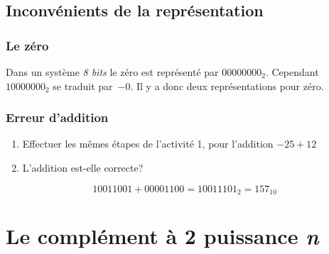 \documentclass[a4paper,11pt]{article}
\begin{document}
\begin{Form}
\subsection{Inconvénients de la représentation}
\subsubsection{Le zéro}
Dans un système \emph{8 bits} le zéro est représenté par $00000000_2$. Cependant $10000000_2$ se traduit par~$-0$. Il y a donc deux représentations pour zéro.
\subsubsection{Erreur d'addition}
\begin{activite}
\begin{enumerate}
\item Effectuer les mêmes étapes de l'activité 1, pour l'addition $-25 + 12$
\item L'addition est-elle correcte?
\end{enumerate}
\end{activite}
\begin{commentprof}
$$10011001 + 00001100 = 10011101_2 = 157_{10}$$
\end{commentprof}
\section{Le complément à 2 puissance \emph{n}}

\end{Form}
\end{document}
